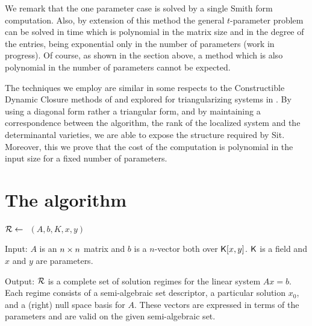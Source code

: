 We remark that the one parameter case is solved by a single Smith form
computation.  
Also, by extension of this method the general $t$-parameter problem can be solved in 
time which is polynomial in the matrix size and in the degree of the entries,
being exponential only in the number of parameters (work in progress).
Of course, as shown in the section above, a method which is also polynomial 
in the number of parameters cannot be expected. 

The techniques we employ are similar in some respects to the
Constructible Dynamic Closure methods of \cite{Duv} and
explored for triangularizing systems in \cite{Gom}.  By using a
diagonal form rather a triangular form, and by maintaining a
correspondence between the algorithm, the rank of the localized system
and the determinantal varieties, we are able to expose the structure
required by Sit.  Moreover, this we prove that the cost of the
computation is polynomial in the input size for a fixed number of
parameters.



\newpage
\section{The algorithm}
\begin{center} ${\cal R} \leftarrow~ $ \StPLS$(A, b, K, x, y) $ \end{center}

Input:
$A$ is an ${n\times n}$ matrix and $b$ is a $n$-vector both over ${\mathsf K}[x,y]$.
${\mathsf K}$ is a field and $x$ and $y$ are parameters.  

Output:
${\cal R}$ is a complete set of solution regimes for the linear system $Ax = b$.
Each regime consists of a semi-algebraic set descriptor, a particular solution $x_0$, 
and a (right) null space basis for $A$.  These vectors are expressed in terms 
of the parameters and are valid on the given semi-algebraic set.

